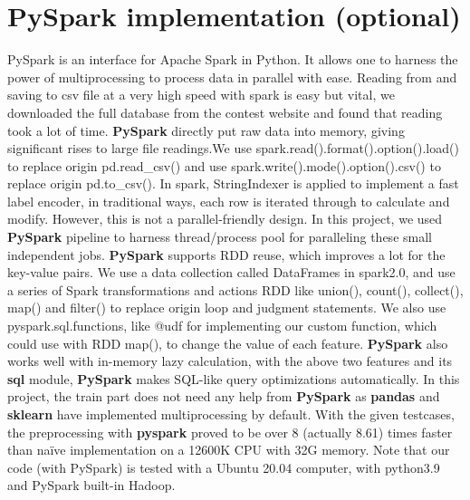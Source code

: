 \documentclass{article}
\begin{document}
	\section{PySpark implementation (optional)}
	PySpark is an interface for Apache Spark in Python. It allows one to harness the power of multiprocessing to process data in parallel with ease.
	\newline
	Reading from and saving to csv file at a very high speed with spark is easy but vital, we downloaded the full database from the contest website and found that reading took a lot of time. \textbf{PySpark} directly put raw data into memory, giving significant rises to large file readings.We use spark.read().format().option().load() to replace origin pd.read\_csv() and use spark.write().mode().option().csv() to replace origin pd.to\_csv().
	\newline
	In spark, StringIndexer is applied to implement a fast label encoder, in traditional ways, each row is iterated through to calculate and modify. However, this is not a parallel-friendly design. In this project, we used \textbf{PySpark} pipeline to harness thread/process pool for paralleling these small independent jobs.
	\newline
	\textbf{PySpark} supports RDD reuse, which improves a lot for the key-value pairs. We use a data collection called DataFrames in spark2.0, and use a series of Spark transformations and actions RDD like union(), count(), collect(), map() and filter() to replace origin loop and judgment statements.
	\newline
	We also use pyspark.sql.functions, like @udf for implementing our custom function, which could use with RDD map(), to change the value of each feature.
	\newline
	\textbf{PySpark} also works well with in-memory lazy calculation, with the above two features and its \textbf{sql} module, \textbf{PySpark} makes SQL-like query optimizations automatically. 
	\newline
	In this project, the train part does not need any help from \textbf{PySpark} as \textbf{pandas} and \textbf{sklearn} have implemented multiprocessing by default.
	With the given testcases, the preprocessing with \textbf{pyspark} proved to be over 8 (actually 8.61) times faster than naïve implementation on a 12600K CPU with 32G memory.
	\newline
	Note that our code (with PySpark) is tested with a Ubuntu 20.04 computer, with python3.9 and PySpark built-in Hadoop.
	
\end{document}
